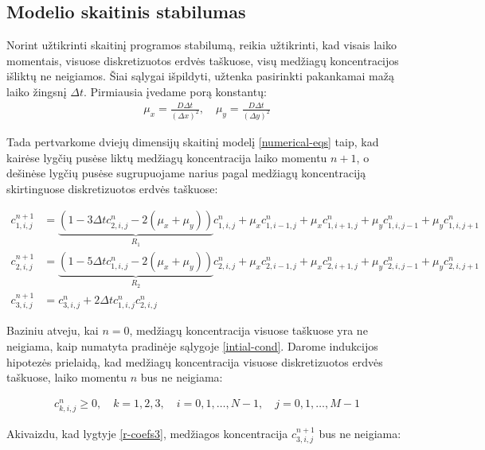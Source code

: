 \subsection{Modelio skaitinis stabilumas}

Norint užtikrinti skaitinį programos stabilumą, reikia užtikrinti, kad visais laiko momentais, visuose diskretizuotos erdvės taškuose, visų medžiagų koncentracijos išliktų ne neigiamos. Šiai sąlygai išpildyti, užtenka pasirinkti pakankamai mažą laiko žingsnį $\Delta t$. Pirmiausia įvedame porą konstantų:
\begin{align*}
\mu_x = \frac{D\Delta t}{(\Delta x)^2}, \quad
\mu_y = \frac{D\Delta t}{(\Delta y)^2}
\end{align*}

Tada pertvarkome dviejų dimensijų skaitinį modelį \eqref{numerical-eqs} taip, kad kairėse lygčių pusėse liktų medžiagų koncentracija laiko momentu $n+1$, o dešinėse lygčių pusėse sugrupuojame narius pagal medžiagų koncentraciją skirtinguose diskretizuotos erdvės taškuose:

\begin{subequations} \label{eqs:r-coefs}
    \begin{align}
    c^{n+1}_{1,i,j}&=\underbrace{(1-3\Delta tc^{n}_{2,i,j}-2(\mu_x+\mu_y))}_{R_1}c^n_{1,i,j}+\mu_xc^n_{1,i-1,j}+\mu_xc^n_{1,i+1,j}+\mu_yc^n_{1,i,j-1}+\mu_yc^n_{1,i,j+1} \label{r-coefs1}\\
    c^{n+1}_{2,i,j}&=\underbrace{(1-5\Delta tc^{n}_{1,i,j}-2(\mu_x+\mu_y))}_{R_2}c^n_{2,i,j}+\mu_xc^n_{2,i-1,j}+\mu_xc^n_{2,i+1,j}+\mu_yc^n_{2,i,j-1}+\mu_yc^n_{2,i,j+1} \label{r-coefs2}\\
    c^{n+1}_{3,i,j}&=c^n_{3,i,j}+2\Delta tc^{n}_{1,i,j}c^{n}_{2,i,j} \label{r-coefs3}
    \end{align}
\end{subequations}

Baziniu atveju, kai $n=0$, medžiagų koncentracija visuose taškuose yra ne neigiama, kaip numatyta pradinėje sąlygoje \eqref{intial-cond}. Darome indukcijos hipotezės prielaidą, kad medžiagų koncentracija visuose diskretizuotos erdvės taškuose, laiko momentu $n$ bus ne neigiama:

\begin{align} \label{induction-assumption}
  c^n_{k,i,j} \geqslant 0, \quad k=1,2,3,\quad i=0,1,\dots,N-1,\quad j=0,1,\dots,M-1
\end{align}

Akivaizdu, kad lygtyje \eqref{r-coefs3}, medžiagos koncentracija $c^{n+1}_{3,i,j}$ bus ne neigiama:

